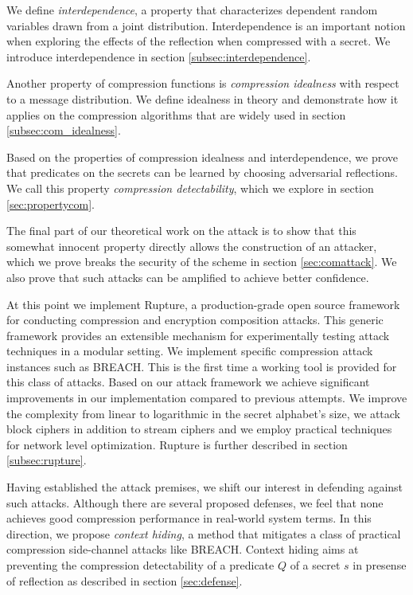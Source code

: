 \documentclass[conference, letterpaper, 10pt]{IEEEtran}
\begin{document}
We define \textit{interdependence}, a property that characterizes dependent
random variables drawn from a joint distribution. Interdependence is an
important notion when exploring the effects of the reflection when compressed
with a secret. We introduce interdependence in section
\ref{subsec:interdependence}.

Another property of compression functions is \textit{compression idealness} with
respect to a message distribution. We
define idealness in theory and demonstrate how it applies on the compression
algorithms that are widely used in section \ref{subsec:com_idealness}.

Based on the properties of compression idealness and interdependence, we prove
that predicates on the secrets can be learned by choosing adversarial
reflections. We call this property \textit{compression detectability}, which we
explore in section \ref{sec:propertycom}.

The final part of our theoretical work on the attack is to show that this
somewhat innocent property directly allows the construction of an attacker,
which we prove breaks the security of the scheme in section
\ref{sec:comattack}. We also prove that such attacks can be amplified to
achieve better confidence.

At this point we implement Rupture\footnotemark[1], a production-grade open
source framework for conducting compression and encryption composition attacks.
This generic framework provides an extensible mechanism for experimentally
testing attack techniques in a modular setting. We implement specific
compression attack instances such as BREACH. This is the first time a working
tool is provided for this class of attacks.  Based on our attack framework we
achieve significant improvements in our implementation compared to previous
attempts. We improve the complexity from linear to logarithmic in the secret
alphabet's size, we attack block ciphers in addition to stream ciphers and we
employ practical techniques for network level optimization.  Rupture is further
described in section \ref{subsec:rupture}.

Having established the attack premises, we shift our interest in defending
against such attacks. Although there are several proposed defenses, we feel that
none achieves good compression performance in real-world system terms. In this
direction, we propose \textit{context hiding}, a method that mitigates a class
of practical compression side-channel attacks like BREACH. Context hiding aims
at preventing the compression detectability of a predicate $Q$ of a secret $s$
in presense of reflection as described in section \ref{sec:defense}.
\end{document}
